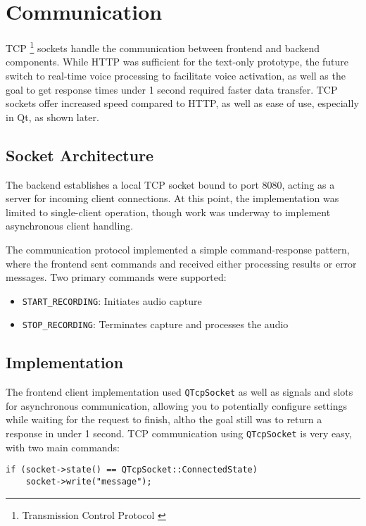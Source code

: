 \section{Communication}
TCP \footnote{Transmission Control Protocol \cite{tcp}} sockets handle the communication between frontend and backend components.
While HTTP was sufficient for the text-only prototype, the future switch to real-time
voice processing to facilitate voice activation, as well as the goal to get response times
under 1 second required faster data transfer. TCP sockets offer increased speed compared to
HTTP, as well as ease of use, especially in Qt, as shown later.

\subsection{Socket Architecture}
The backend establishes a local TCP socket bound to port 8080,
acting as a server for incoming client connections.
At this point, the implementation was limited to single-client operation,
though work was underway to implement asynchronous client handling.

The communication protocol implemented a simple command-response pattern,
where the frontend sent commands and received either processing results or error messages.
Two primary commands were supported:

\begin{itemize}
    \item \texttt{START\_RECORDING}: Initiates audio capture
    \item \texttt{STOP\_RECORDING}: Terminates capture and processes the audio
\end{itemize}

\subsection{Implementation}
The frontend client implementation used \texttt{QTcpSocket} as well as signals and slots for asynchronous communication,
allowing you to potentially configure settings while waiting for the request to finish, altho the goal
still was to return a response in under 1 second.
TCP communication using \texttt{QTcpSocket} is very easy, with two main commands:

\begin{verbatim}
if (socket->state() == QTcpSocket::ConnectedState)
    socket->write("message");
\end{verbatim}

